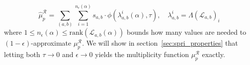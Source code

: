 \documentclass[10pt]{article}
\newenvironment{boxedenumerate}
  {\begin{mdframed}[font=\small, linewidth=1pt]}
  {\end{mdframed}}
\numberwithin{equation}{section}
\newcommand{\+}{%
	\raisebox{0.18ex}{\scaleobj{0.55}{+}}
}
\newcommand\restr[2]{{%
  \left.\kern-\nulldelimiterspace %
  #1 %
  \vphantom{\big|} %
  \right|_{#2} %
  }}
\theoremstyle{definition}
\theoremstyle{definition}
\begin{document}
\begin{boxedenumerate}
\begin{enumerate}
	$$
	\hat{\mu}^\mathcal{R}_p = \sum\limits_{(a,b)}\sum\limits_{i=1}^{n_\epsilon(\alpha)} s_{a,b} \cdot \phi(\lambda_{a,b}^{i}(\alpha), \tau), \quad \lambda_{a,b}^{i} = \Lambda(\mathcal{L}_{a,b})_i
	$$
	where $1 \leq n_\epsilon(\alpha) \leq \mathrm{rank}(\mathcal{L}_{a,b}(\alpha))$ bounds how many values are needed to $(1-\epsilon)$-approximate $\mu_p^\mathcal{R}$. 
	We will show in section~\ref{sec:spri_properties} that letting both $\tau \to 0$ and $\epsilon \to 0$ yields the multiplicity function $\mu_p^\mathcal{R}$ exactly.
\end{enumerate}
\end{boxedenumerate}
\end{document}
